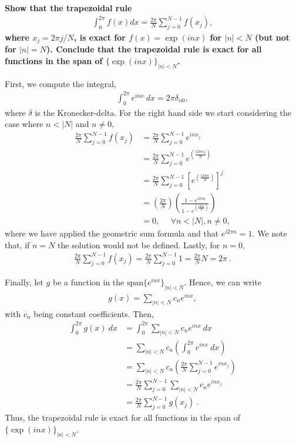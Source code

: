 \textbf{Show that the trapezoidal rule
\begin{align*}
\int_0^{2\pi} f(x)dx = \frac{2\pi}{N}\sum_{j=0}^{N-1} f(x_j),
\end{align*}
where $x_j = 2\pi j/N$, is exact for $f(x) = \exp(inx)$ for $|n|<N$ (but not for $|n|=N$). Conclude that the trapezoidal rule is exact for all functions in the span of $\{\exp(inx)\}_{|n|<N}$. }
\newline

First, we compute the integral,
\begin{align*}
\int_0^{2\pi} e^{inx} ~dx =2\pi\delta_{n0},
\end{align*}
where $\delta$ is the Kronecker-delta. For the right hand side we start considering the case where $n < |N|$ and $n \neq 0$,
\begin{align*}
\frac{2\pi}{N}\sum_{j=0}^{N-1} f(x_j)&=\frac{2\pi}{N}\sum_{j=0}^{N-1} e^{inx_j} \\
&= \frac{2\pi}{N}\sum_{j=0}^{N-1} e^{\left(\frac{i2\pi n j}{N} \right)} \\
&=  \frac{2\pi}{N}\sum_{j=0}^{N-1} \left[e^{\left(\frac{i2\pi n}{N} \right)}\right]^j \\
& = \left(\frac{2\pi}{N}\right)\left(\frac{1-e^{i2\pi n}}{1-e^{\left(\frac{i2\pi n}{N}\right)}} \right) \\
& = 0,~~~~~~\forall n<|N|,n\neq 0,
\end{align*}
where we have applied the geometric sum formula and that $e^{i2\pi n}=1$. We note that, if $n=N$ the solution would not be defined. Lastly, for $n=0$,
\begin{align*}
\frac{2\pi}{N}\sum_{j=0}^{N-1} f(x_j)=\frac{2\pi}{N}\sum_{j=0}^{N-1} 1 = \frac{2\pi}{N} N = 2\pi~.
\end{align*}

Finally, let $g$ be a function in the $\text{span} \{e^{inx}\}_{|n|<N}$. Hence, we can write
\begin{align*}
g(x) = \sum_{|n|<N} c_ne^{inx},
\end{align*}
with $c_n$ being constant coefficients. Then,
\begin{align*}
\int_0^{2\pi} g(x)~dx &=\int_0^{2\pi} \sum_{|n|<N} c_n  e^{inx}~dx\\
&= \sum_{|n|<N} c_n\left( \int_0^{2\pi} e^{inx}~dx \right)\\ 
&= \sum_{|n|<N} c_n \left( \frac{2\pi}{N}\sum_{j=0}^{N-1} e^{inx_j} \right)\\ 
&= \frac{2\pi}{N} \sum_{j=0}^{N-1} \sum_{|n|<N} c_ne^{inx_j} \\
&= \frac{2\pi}{N} \sum_{j=0}^{N-1} g(x_j)~.
\end{align*}
Thus, the trapezoidal rule is exact for all functions in the span of $\{\exp(inx)\}_{|n|<N}$.
